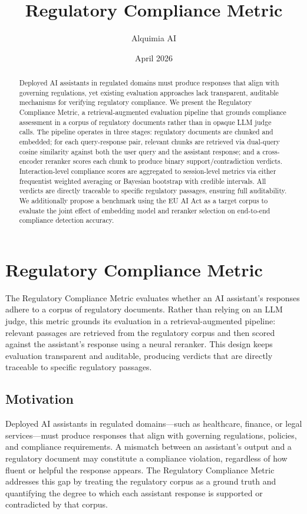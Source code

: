 \documentclass[11pt]{article}
\title{Regulatory Compliance Metric}
\author{Alquimia AI}
\date{April 2026}
\begin{document}
\maketitle

\begin{abstract}
Deployed AI assistants in regulated domains must produce responses that align with governing regulations, yet existing evaluation approaches lack transparent, auditable mechanisms for verifying regulatory compliance. We present the Regulatory Compliance Metric, a retrieval-augmented evaluation pipeline that grounds compliance assessment in a corpus of regulatory documents rather than in opaque LLM judge calls. The pipeline operates in three stages: regulatory documents are chunked and embedded; for each query-response pair, relevant chunks are retrieved via dual-query cosine similarity against both the user query and the assistant response; and a cross-encoder reranker scores each chunk to produce binary support/contradiction verdicts. Interaction-level compliance scores are aggregated to session-level metrics via either frequentist weighted averaging or Bayesian bootstrap with credible intervals. All verdicts are directly traceable to specific regulatory passages, ensuring full auditability. We additionally propose a benchmark using the EU AI Act as a target corpus to evaluate the joint effect of embedding model and reranker selection on end-to-end compliance detection accuracy.
\end{abstract}

\section{Regulatory Compliance Metric}

The Regulatory Compliance Metric evaluates whether an AI assistant's responses adhere to a corpus of regulatory documents. Rather than relying on an LLM judge, this metric grounds its evaluation in a retrieval-augmented pipeline: relevant passages are retrieved from the regulatory corpus and then scored against the assistant's response using a neural reranker. This design keeps evaluation transparent and auditable, producing verdicts that are directly traceable to specific regulatory passages.

\subsection{Motivation}

Deployed AI assistants in regulated domains---such as healthcare, finance, or legal services---must produce responses that align with governing regulations, policies, and compliance requirements. A mismatch between an assistant's output and a regulatory document may constitute a compliance violation, regardless of how fluent or helpful the response appears. The Regulatory Compliance Metric addresses this gap by treating the regulatory corpus as a ground truth and quantifying the degree to which each assistant response is supported or contradicted by that corpus.
\end{document}
